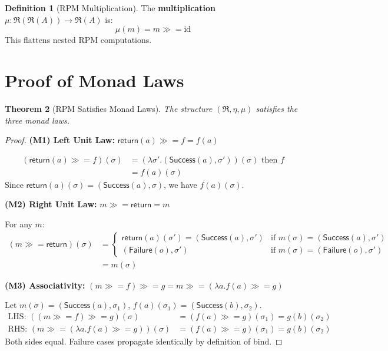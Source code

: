 \documentclass[11pt,twoside,openright]{book}
\theoremstyle{definition}
\newtheorem{definition}{Definition}[chapter]
\theoremstyle{plain}
\newtheorem{theorem}[definition]{Theorem}
\theoremstyle{remark}
\newcommand{\RPM}{\mathfrak{R}}
\newcommand{\rpmret}{\mathsf{return}}
\newcommand{\rpmbind}{\mathbin{\gg\!=}}
\newcommand{\id}{\mathrm{id}}
\begin{document}
\begin{definition}[RPM Multiplication]
\label{def:rpm-mult}
The \textbf{multiplication} $\mu : \RPM(\RPM(A)) \to \RPM(A)$ is:
\[
\mu(m) = m \rpmbind \id
\]
This flattens nested RPM computations.
\end{definition}

\section{Proof of Monad Laws}

\begin{theorem}[RPM Satisfies Monad Laws]
\label{thm:rpm-monad-laws}
The structure $(\RPM, \eta, \mu)$ satisfies the three monad laws.
\end{theorem}

\begin{proof}
\textbf{(M1) Left Unit Law:} $\rpmret(a) \rpmbind f = f(a)$

\begin{align}
(\rpmret(a) \rpmbind f)(\sigma) &= (\lambda \sigma'. (\mathsf{Success}(a), \sigma'))(\sigma) \text{ then } f \\
&= f(a)(\sigma)
\end{align}
Since $\rpmret(a)(\sigma) = (\mathsf{Success}(a), \sigma)$, we have $f(a)(\sigma)$.

\textbf{(M2) Right Unit Law:} $m \rpmbind \rpmret = m$

For any $m$:
\begin{align}
(m \rpmbind \rpmret)(\sigma) &= \begin{cases}
\rpmret(a)(\sigma') = (\mathsf{Success}(a), \sigma') & \text{if } m(\sigma) = (\mathsf{Success}(a), \sigma') \\
(\mathsf{Failure}(o), \sigma') & \text{if } m(\sigma) = (\mathsf{Failure}(o), \sigma')
\end{cases} \\
&= m(\sigma)
\end{align}

\textbf{(M3) Associativity:} $(m \rpmbind f) \rpmbind g = m \rpmbind (\lambda a. f(a) \rpmbind g)$

Let $m(\sigma) = (\mathsf{Success}(a), \sigma_1)$, $f(a)(\sigma_1) = (\mathsf{Success}(b), \sigma_2)$.
\begin{align}
\text{LHS: } ((m \rpmbind f) \rpmbind g)(\sigma) &= (f(a) \rpmbind g)(\sigma_1) = g(b)(\sigma_2) \\
\text{RHS: } (m \rpmbind (\lambda a. f(a) \rpmbind g))(\sigma) &= (f(a) \rpmbind g)(\sigma_1) = g(b)(\sigma_2)
\end{align}
Both sides equal. Failure cases propagate identically by definition of bind.
\end{proof}
\end{document}
